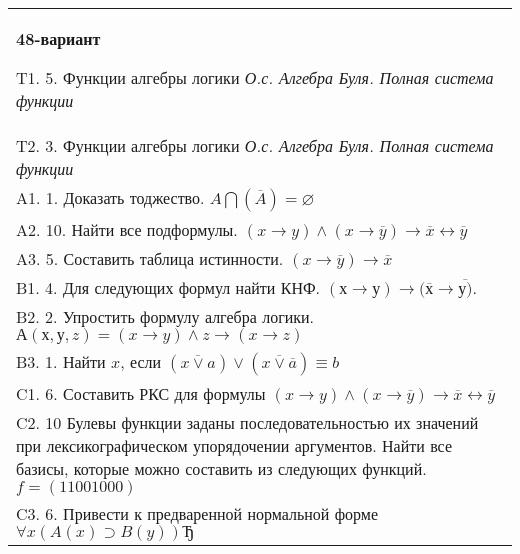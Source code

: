 \documentclass{article}
\begin{document}
\begin{tabular}{m{17cm}}
\textbf{48-вариант}
\newline

T1. 5. Функции алгебры логики \emph{О.с. Алгебра Буля. Полная система функции} \\
T2. 3. Функции алгебры логики \emph{О.с. Алгебра Буля. Полная система функции} \\
A1. 1. Доказать тоджество. \(A\bigcap(\overline{A}) = \varnothing\) \\
A2. 10. Найти все подформулы. \((x \rightarrow y) \land (x \rightarrow \overline{y}) \rightarrow \overline{x} \leftrightarrow \overline{y}\) \\
A3. 5. Составить таблица истинности. \((x \rightarrow \overline{y}) \rightarrow \overline{x}\) \\
B1. 4. Для следующих формул найти КНФ. \((х \rightarrow у) \rightarrow (\overline{х} \rightarrow \overline{у)}\). \\
B2. 2. Упростить формулу алгебра логики. \(А(х,у,z) = (x \rightarrow y) \land z \rightarrow (x \rightarrow z)\) \\
B3. 1. Найти \(x\), если \(\left( \overline{x \vee a} \right) \vee \left( \overline{x \vee \overline{a}} \right) \equiv b\) \\
C1. 6. Составить РКС для формулы \((x \rightarrow y) \land (x \rightarrow \overline{y}) \rightarrow \overline{x} \leftrightarrow \overline{y}\) \\
C2. 10 Булевы функции заданы последовательностью их значений при лексикографическом упорядочении аргументов. Найти все базисы, которые можно составить из следующих функций. \(f = (11001000)\) \\
C3. 6. Привести к предваренной нормальной форме \(\forall x(A(x) \supset B(y))Ђ\) \\

\end{tabular}
\vspace{1cm}
\end{document}
